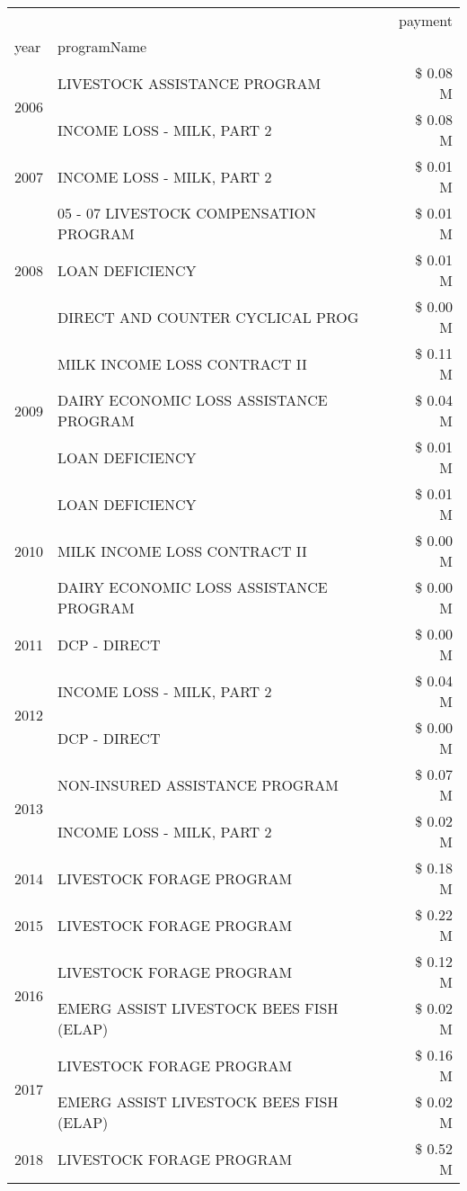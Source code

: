 \begin{tabular}{llr}
\toprule
 &  & payment \\
year & programName &  \\
\midrule
\multirow[t]{2}{*}{2006} & LIVESTOCK ASSISTANCE PROGRAM & \$ 0.08 M \\
 & INCOME LOSS - MILK, PART 2 & \$ 0.08 M \\
\cline{1-3}
2007 & INCOME LOSS - MILK, PART 2 & \$ 0.01 M \\
\cline{1-3}
\multirow[t]{3}{*}{2008} & 05 - 07 LIVESTOCK COMPENSATION PROGRAM & \$ 0.01 M \\
 & LOAN DEFICIENCY & \$ 0.01 M \\
 & DIRECT AND COUNTER CYCLICAL PROG & \$ 0.00 M \\
\cline{1-3}
\multirow[t]{3}{*}{2009} & MILK INCOME LOSS CONTRACT II & \$ 0.11 M \\
 & DAIRY ECONOMIC LOSS ASSISTANCE PROGRAM & \$ 0.04 M \\
 & LOAN DEFICIENCY & \$ 0.01 M \\
\cline{1-3}
\multirow[t]{3}{*}{2010} & LOAN DEFICIENCY & \$ 0.01 M \\
 & MILK INCOME LOSS CONTRACT II & \$ 0.00 M \\
 & DAIRY ECONOMIC LOSS ASSISTANCE PROGRAM & \$ 0.00 M \\
\cline{1-3}
2011 & DCP - DIRECT & \$ 0.00 M \\
\cline{1-3}
\multirow[t]{2}{*}{2012} & INCOME LOSS - MILK, PART 2 & \$ 0.04 M \\
 & DCP - DIRECT & \$ 0.00 M \\
\cline{1-3}
\multirow[t]{2}{*}{2013} & NON-INSURED ASSISTANCE PROGRAM & \$ 0.07 M \\
 & INCOME LOSS - MILK, PART 2 & \$ 0.02 M \\
\cline{1-3}
2014 & LIVESTOCK FORAGE PROGRAM & \$ 0.18 M \\
\cline{1-3}
2015 & LIVESTOCK FORAGE PROGRAM & \$ 0.22 M \\
\cline{1-3}
\multirow[t]{2}{*}{2016} & LIVESTOCK FORAGE PROGRAM & \$ 0.12 M \\
 & EMERG ASSIST LIVESTOCK BEES FISH (ELAP) & \$ 0.02 M \\
\cline{1-3}
\multirow[t]{2}{*}{2017} & LIVESTOCK FORAGE PROGRAM & \$ 0.16 M \\
 & EMERG ASSIST LIVESTOCK BEES FISH (ELAP) & \$ 0.02 M \\
\cline{1-3}
\multirow[t]{3}{*}{2018} & LIVESTOCK FORAGE PROGRAM & \$ 0.52 M \\

\end{tabular}
